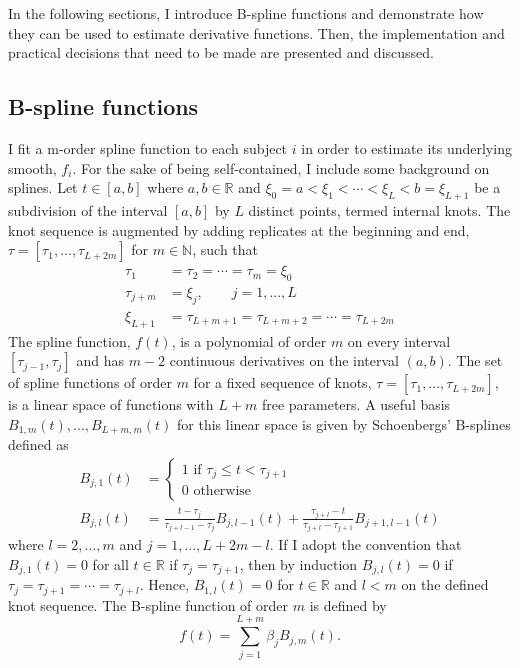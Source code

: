 In the following sections, I introduce B-spline functions and demonstrate how they can be used to estimate derivative functions. Then, the implementation and practical decisions that need to be made are presented and discussed.

\subsection{B-spline functions}\label{sec:bsplines}
I fit a m-order spline function to each subject $i$ in order to estimate its underlying smooth, $f_i$. For the sake of being self-contained, I include some background on splines. Let $t\in[a,b]$ where $a,b\in\mathbb{R}$ and $\xi_0=a<\xi_{1}<\cdots<\xi_{L} < b = \xi_{L+1}$ be a subdivision of  the interval $[a,b]$ by $L$ distinct points, termed internal knots. The knot sequence is augmented by adding replicates at the beginning and end, $\tau=[\tau_{1},...,\tau_{L+2m}]$ for $m\in\mathbb{N}$, such that 
\begin{align*}
\tau_{1}&=\tau_{2}=\cdots =\tau_{m} =\xi_{0}\\
\tau_{j+m}& = \xi_{j}, \quad\quad j=1,...,L\\
\xi_{L+1}&=\tau_{L+m+1}=\tau_{L+m+2}=\cdots =\tau_{L+2m} 
\end{align*}
The spline function, $f(t)$, is a polynomial of order $m$ on every interval $[\tau_{j-1},\tau_{j}]$ and has $m-2$ continuous derivatives on the interval $(a,b)$. The set of spline functions of order $m$ for a fixed sequence of knots, $\tau = [\tau_1,...,\tau_{L+2m}]$, is a linear space of functions with $L+m$ free parameters. A useful basis $B_{1,m}(t),...,B_{L+m,m}(t)$ for this linear space is given by Schoenbergs' B-splines \cite{curry1966, de1976} defined as
\begin{align*}
B_{j,1}(t) &= \begin{cases}
1 \text{ if }\tau_j\leq t < \tau_{j+1}\\
0\text{ otherwise}
\end{cases}\\
B_{j,l}(t) &= \frac{t-\tau_j}{\tau_{j+l-1}-\tau_j} B_{j,l-1}(t)+\frac{\tau_{j+l}-t}{\tau_{j+l}-\tau_{j+1}} B_{j+1,l-1}(t)
\end{align*}
where $l=2,...,m$ and $j=1,...,L+2m-l$.  If I adopt the convention that $B_{j,1}(t)=0$ for all $t\in\mathbb{R}$ if $\tau_{j}=\tau_{j+1}$, then by induction $B_{j,l}(t)=0$ if $\tau_{j}=\tau_{j+1}=\cdots=\tau_{j+l}$. Hence, $B_{1,l}(t)=0$ for $t\in\mathbb{R}$ and $l<m$ on the defined knot sequence. The B-spline function of order $m$ is defined by
$$f(t) = \sum^{L+m}_{j=1} \beta_j B_{j,m}(t).$$


